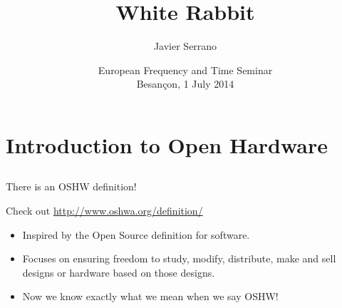 \documentclass[compress, red]{beamer}
\title{White Rabbit}
\author[J. Serrano] %
{Javier Serrano}
\institute{CERN BE-CO\\Hardware and Timing section}
\date[1 July 2014]{European Frequency and Time Seminar\\Besançon, 1 July 2014}
\begin{document}

\frame{
	\titlepage 
}



\frame{\tableofcontents}




\section[OSHW Intro]{Introduction to Open Hardware}
\subsection{}

\begin{frame}{There is an OSHW definition!}

\begin{block}{Check out \href{http://www.oshwa.org/definition/}{http://www.oshwa.org/definition/}}
\begin{itemize}
 \item Inspired by the Open Source definition for software.
 \item Focuses on ensuring freedom to study, modify, distribute, make
   and sell designs or hardware based on those designs.
 \item Now we know exactly what we mean when we say OSHW!
\end{itemize}
\end{block}
\end{frame}
\end{document}

